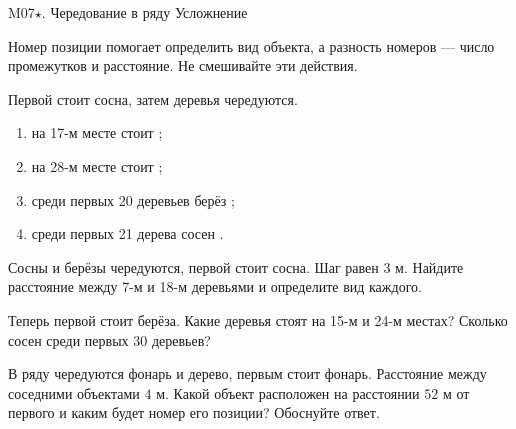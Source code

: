 \worksheettitle
  {M07\(\star\). Чередование в ряду}
  { Усложнение}

\studentnameblock

\begin{notebox}
  Номер позиции помогает определить вид объекта, а разность номеров ---
  число промежутков и расстояние. Не смешивайте эти действия.
\end{notebox}

\alternatingtreesfigure

\begin{practicebox}
  Первой стоит сосна, затем деревья чередуются.
  \begin{enumerate}[label=\alph*)]
    \item на 17-м месте стоит \answerblank[25mm];
    \item на 28-м месте стоит \answerblank[25mm];
    \item среди первых 20 деревьев берёз \answerblank[15mm];
    \item среди первых 21 дерева сосен \answerblank[15mm].
  \end{enumerate}
\end{practicebox}

\begin{practicebox}
  Сосны и берёзы чередуются, первой стоит сосна. Шаг равен $3$ м.
  Найдите расстояние между 7-м и 18-м деревьями и определите вид каждого.
\end{practicebox}

\begin{practicebox}
  Теперь первой стоит берёза. Какие деревья стоят на 15-м и 24-м местах?
  Сколько сосен среди первых 30 деревьев? 
\end{practicebox}

\begin{checkpointbox}
  В ряду чередуются фонарь и дерево, первым стоит фонарь. Расстояние между
  соседними объектами $4$ м. Какой объект расположен на расстоянии $52$ м
  от первого и каким будет номер его позиции? Обоснуйте ответ.
\end{checkpointbox}
